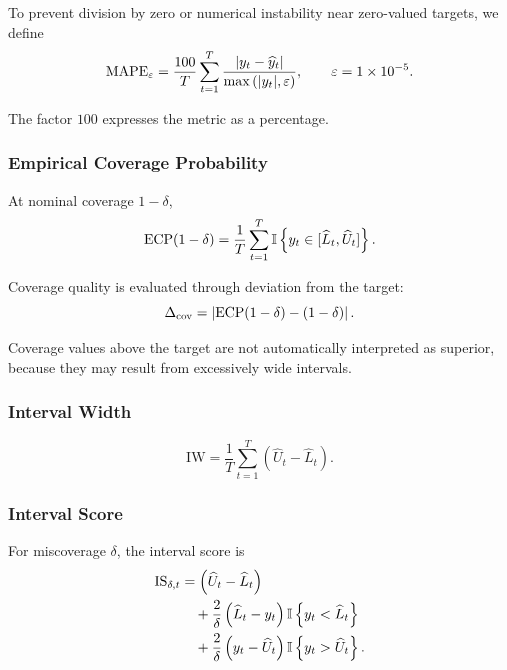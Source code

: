 \documentclass[review,number,sort&compress]{elsarticle}
\begin{document}
To prevent division by zero or numerical instability near zero-valued targets,
we define
\begin{equation}
    \mathrm{MAPE}_{\varepsilon}
    =
    \frac{100}{T}
    \sum_{t=1}^{T}
    \frac{
        \left|
        y_t-\widehat{y}_t
        \right|
    }{
        \max
        \left(
        |y_t|,
        \varepsilon
        \right)
    },
    \qquad
    \varepsilon=1\times10^{-5}.
    \label{eq:mape_eps}
\end{equation}

The factor $100$ expresses the metric as a percentage.

\subsubsection{Empirical Coverage Probability}

At nominal coverage $1-\delta$,
\begin{equation}
    \mathrm{ECP}(1-\delta)
    =
    \frac{1}{T}
    \sum_{t=1}^{T}
    \mathbb{I}
    \left\{
    y_t
    \in
    [\widehat{L}_t,\widehat{U}_t]
    \right\}.
    \label{eq:ecp}
\end{equation}

Coverage quality is evaluated through deviation from the target:
\begin{equation}
    \Delta_{\mathrm{cov}}
    =
    \left|
    \mathrm{ECP}(1-\delta)-(1-\delta)
    \right|.
    \label{eq:coverage_deviation}
\end{equation}

Coverage values above the target are not automatically interpreted as superior,
because they may result from excessively wide intervals.

\subsubsection{Interval Width}

\begin{equation}
    \mathrm{IW}
    =
    \frac{1}{T}
    \sum_{t=1}^{T}
    \left(
    \widehat{U}_t-\widehat{L}_t
    \right).
    \label{eq:interval_width}
\end{equation}

\subsubsection{Interval Score}

For miscoverage $\delta$, the interval score is
\begin{align}
    \mathrm{IS}_{\delta,t}
    &=
    \left(
    \widehat{U}_t-\widehat{L}_t
    \right)
    \nonumber\\
    &\quad+
    \frac{2}{\delta}
    \left(
    \widehat{L}_t-y_t
    \right)
    \mathbb{I}
    \left\{
    y_t<\widehat{L}_t
    \right\}
    \nonumber\\
    &\quad+
    \frac{2}{\delta}
    \left(
    y_t-\widehat{U}_t
    \right)
    \mathbb{I}
    \left\{
    y_t>\widehat{U}_t
    \right\}.
    \label{eq:interval_score}
\end{align}
\end{document}
